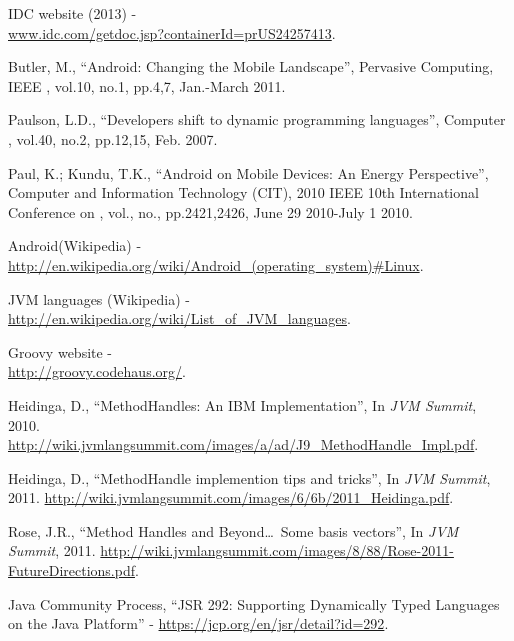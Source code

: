 \documentclass{sig-alternate}
\def \ANDROID{Android\xspace}
\def \JVM{JVM\xspace}
\begin{document}
\begin{thebibliography}{}

  IDC website (2013) - \\ \url{www.idc.com/getdoc.jsp?containerId=prUS24257413}.

  Butler, M., ``\ANDROID: Changing the Mobile Landscape'', Pervasive Computing, IEEE , vol.10, no.1, pp.4,7, Jan.-March 2011.

  Paulson, L.D., ``Developers shift to dynamic programming languages'', Computer , vol.40, no.2, pp.12,15, Feb. 2007.

  Paul, K.; Kundu, T.K., ``\ANDROID on Mobile Devices: An Energy Perspective'', Computer and Information Technology (CIT), 2010 IEEE 10th International Conference on , vol., no., pp.2421,2426, June 29 2010-July 1 2010.

  \ANDROID (Wikipedia) - \\ \url{http://en.wikipedia.org/wiki/Android\_(operating\_system)#Linux}.

  \JVM languages (Wikipedia) - \\ \url{http://en.wikipedia.org/wiki/List\_of\_JVM\_languages}.

  Groovy website - \\ \url{http://groovy.codehaus.org/}.
  
  Heidinga, D., ``MethodHandles: An IBM Implementation'', In {\it JVM Summit}, 2010. \url{http://wiki.jvmlangsummit.com/images/a/ad/J9_MethodHandle_Impl.pdf}.

  Heidinga, D., ``MethodHandle implemention tips and tricks'', In {\it JVM Summit}, 2011. \url{http://wiki.jvmlangsummit.com/images/6/6b/2011_Heidinga.pdf}.

  Rose, J.R., ``Method Handles and Beyond\dots~Some basis vectors'', In {\it JVM Summit}, 2011. \url{http://wiki.jvmlangsummit.com/images/8/88/Rose-2011-FutureDirections.pdf}.

  Java Community Process, ``JSR 292: Supporting Dynamically Typed Languages on the Java{\scriptsize\texttrademark} Platform'' - \url{https://jcp.org/en/jsr/detail?id=292}.


\end{thebibliography}
\end{document}
